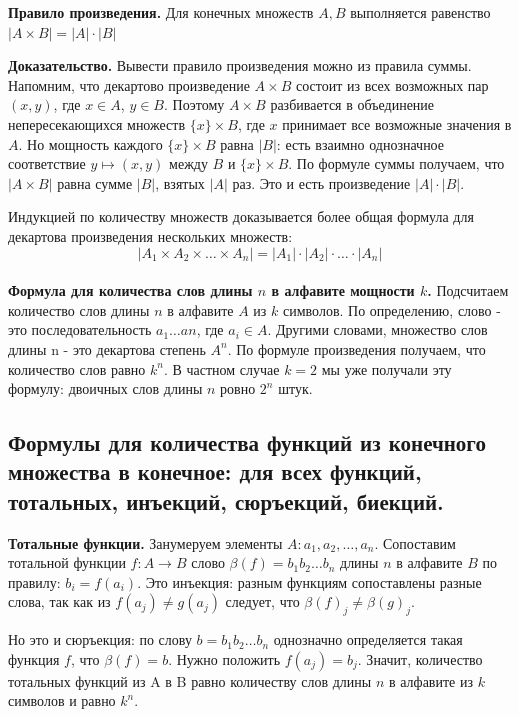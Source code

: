 \documentclass[a4paper, 10pt]{article}
\begin{document}
\textbf{Правило произведения.} Для конечных множеств $A, B$ выполняется равенство $|A \times B| = |A| \cdot |B|$

\textbf{Доказательство.} Вывести правило произведения можно из правила суммы. Напомним, что декартово произведение $A \times B$ состоит из всех возможных пар $(x, y)$, где $x \in A$, $y \in B$. Поэтому $A \times B$ разбивается в объединение непересекающихся множеств $\{x\} \times B$, где $x$ принимает все возможные значения в $A$. Но мощность каждого $\{x\} \times B$ равна $|B|$: есть взаимно однозначное соответствие $y \mapsto (x, y)$ между $B$ и $\{x\} \times B$. По формуле суммы получаем, что $|A \times B|$ равна сумме $|B|$, взятых $|A|$ раз. Это и есть произведение $|A| \cdot |B|$.

Индукцией по количеству множеств доказывается более общая формула для декартова произведения нескольких множеств: $$|A_1 \times A_2 \times \dots \times A_n| = |A_1| \cdot |A_2| \cdot \dots \cdot |A_n|$$ \\

\textbf{Формула для количества слов длины $n$ в алфавите мощности $k$.} Подсчитаем количество слов длины $n$ в алфавите $A$ из $k$ символов. По определению, слово - это последовательность $a_1 \dots an$, где $a_i \in A$. Другими словами, множество слов длины n - это декартова степень $A^n$. По формуле произведения получаем, что количество слов равно $k^n$. В частном случае $k = 2$ мы уже получали эту формулу: двоичных слов длины $n$ ровно $2^n$ штук.

\subsection{Формулы для количества функций из конечного множества в конечное: для всех функций, тотальных, инъекций, сюръекций, биекций.}

\textbf{Тотальные функции.} Занумеруем элементы $A: a_1, a_2, \dots , a_n$. Сопоставим тотальной функции $f : A \to B$ слово $\beta(f) = b_1b_2 \dots b_n$ длины $n$ в алфавите $B$ по правилу: $b_i = f(a_i)$. Это инъекция: разным функциям сопоставлены разные слова, так как из $f(a_j) \neq g(a_j)$ следует, что $\beta(f)_j \neq \beta(g)_j$.

Но это и сюръекция: по слову $b = b_1b_2 \dots b_n$ однозначно определяется такая функция $f$, что $\beta(f) = b$. Нужно положить $f(a_j) = b_j$.
Значит, количество тотальных функций из A в B равно количеству слов длины $n$ в алфавите из $k$ символов и равно $k^n$. \\
\end{document}

